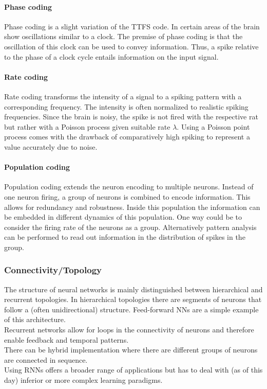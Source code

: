 	\paragraph{Phase coding}
	Phase coding is a slight variation of the \ac{TTFS} code. In certain areas of the brain show oscillations similar to a clock\cite{jacobs_critical_2013}. The premise of phase coding is that the oscillation of this clock can be used to convey information. Thus, a spike relative to the phase of a clock cycle entails information on the input signal.\\
	\paragraph{Rate coding}
	Rate coding transforms the intensity of a signal to a spiking pattern with a corresponding frequency. The intensity is often normalized to realistic spiking frequencies. Since the brain is noisy, the spike is not fired with the respective rat but rather with a Poisson process given suitable rate $\lambda$.
	Using a Poisson point process comes with the drawback of comparatively high spiking to represent a value accurately due to noise\cite{deneve_efficient_2016}.
	\paragraph{Population coding}
	Population coding extends the neuron encoding to multiple neurons. Instead of one neuron firing, a group of neurons is combined to encode information. This allows for redundancy and robustness. Inside this population the information can be embedded in different dynamics of this population. One way could be to consider the firing rate of the neurons as a group. Alternatively pattern analysis can be performed to read out information in the distribution of spikes in the group.\\

\subsubsection{Connectivity/Topology}
	The structure of neural networks is mainly distinguished between hierarchical and recurrent topologies. In hierarchical topologies there are segments of neurons that follow a (often unidirectional) structure. Feed-forward \acp{NN} are a simple example of this architecture.\\
	Recurrent networks allow for loops in the connectivity of neurons and therefore enable feedback and temporal patterns.\\
	There can be hybrid implementation where there are different groups of neurons are connected in sequence.\\
	Using \acp{RNN} offers a broader range of applications but has to deal with (as of this day) inferior or more complex learning paradigms.\\

